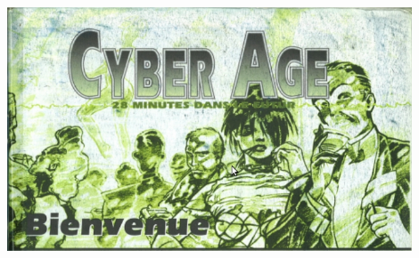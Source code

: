 \documentclass[40pt,twoside,a4paper]{article}
\def\confidentialDGTIKZ{%
	\begin{tikzpicture}[remember picture,overlay]
	\node[rotate=60,scale=7.5,text opacity=0.2] at (current page.center) {Confidential -- Delta Green};
	\end{tikzpicture}
}%
\begin{document}
\setlength\parindent{0pt}


\begin{center} 
	\includegraphics[width=0.90\textwidth]{../img/CyberAgeBienvenue.jpeg} %
\end{center}
\end{document}
